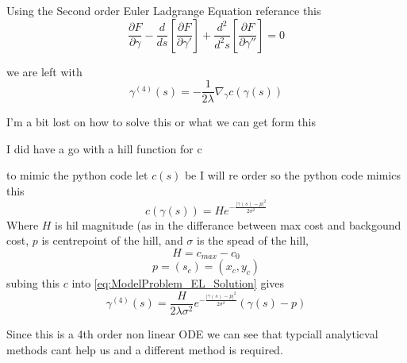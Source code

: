 Using the Second order Euler Ladgrange Equation {\color{red} referance this}
\[
\frac{\partial F}{\partial\gamma} - \frac{d}{ds}\left[\frac{\partial F}{\partial\gamma'}\right] + \frac{d^2}{d^2s}\left[\frac{\partial F}{\partial\gamma''}\right] = 0
\]

we are left with 
\begin{equation}
    \label{eq:ModelProblem_EL_Solution}
    \gamma^{(4)}(s) = -\frac{1}{2\lambda} \nabla_{\gamma} c(\gamma(s))
\end{equation}

{\color{red} I'm a bit lost on how to solve this or what we can get form this}

{\color{red} I did have a go with a hill function for c}

to mimic the python code let $c(s)$ be {\color{red} I will re order so the python code mimics this}
\begin{equation}
    \label{eq:hill_C}
    c(\gamma(s)) = He^{-\frac{|\gamma(s) - p|^2}{2\sigma^2}}
\end{equation} 
Where $H$ is hil magnitude (as in the differance between max cost and backgound cost, $p$ is centrepoint of the hill, and $\sigma$ is the spead of the hill,
\[
H = c_{max} - c_0 
\]
\[
p=(s_c) = (x_c,y_c)
\]
subing this $c$ into \eqref{eq:ModelProblem_EL_Solution} gives
\[
    \gamma^{(4)}(s) = \frac{H}{2\lambda\sigma^2} e^{-\frac{|\gamma(s) - p|^2}{2\sigma^2}}(\gamma(s) - p)
\]

Since this is a 4th order non linear ODE we can see that typciall analyticval methods cant help us and a different method is required.
